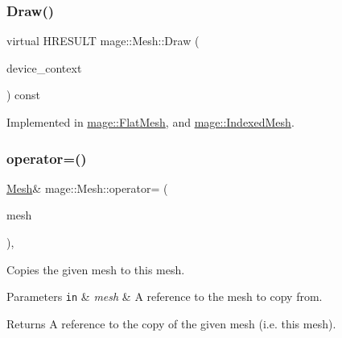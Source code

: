 \hypertarget{classmage_1_1_mesh_a9dff8fa94d28e852fc1e72e6c0a85c6f}{}\label{classmage_1_1_mesh_a9dff8fa94d28e852fc1e72e6c0a85c6f} 
\subsubsection{\texorpdfstring{Draw()}{Draw()}}
{\footnotesize\ttfamily virtual H\+R\+E\+S\+U\+LT mage\+::\+Mesh\+::\+Draw (\begin{DoxyParamCaption}\item[{\hyperlink{namespacemage_ae74f374780900893caa5555d1031fd79}{Com\+Ptr}$<$ I\+D3\+D11\+Device\+Context2 $>$}]{device\+\_\+context }\end{DoxyParamCaption}) const\hspace{0.3cm}{\ttfamily [pure virtual]}}



Implemented in \hyperlink{classmage_1_1_flat_mesh_a84cf747d30acb8cb12ed730cb1b73a14}{mage\+::\+Flat\+Mesh}, and \hyperlink{classmage_1_1_indexed_mesh_a7067c08cb9165cef96f507b8dd9fe568}{mage\+::\+Indexed\+Mesh}.

\hypertarget{classmage_1_1_mesh_a5baf961af32b379671a59a082492bc5e}{}\label{classmage_1_1_mesh_a5baf961af32b379671a59a082492bc5e} 
\subsubsection{\texorpdfstring{operator=()}{operator=()}}
{\footnotesize\ttfamily \hyperlink{classmage_1_1_mesh}{Mesh}\& mage\+::\+Mesh\+::operator= (\begin{DoxyParamCaption}\item[{const \hyperlink{classmage_1_1_mesh}{Mesh} \&}]{mesh }\end{DoxyParamCaption})\hspace{0.3cm}{\ttfamily [private]}, {\ttfamily [delete]}}

Copies the given mesh to this mesh.


\begin{DoxyParams}[1]{Parameters}
\mbox{\tt in}  & {\em mesh} & A reference to the mesh to copy from. \\
\hline
\end{DoxyParams}
\begin{DoxyReturn}{Returns}
A reference to the copy of the given mesh (i.\+e. this mesh). 
\end{DoxyReturn}
